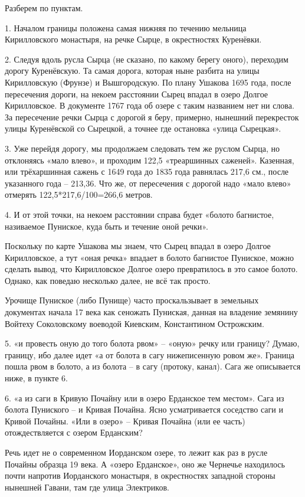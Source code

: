 Разберем по пунктам.

1. Началом границы положена самая нижняя по течению мельница Кирилловского монастыря, на речке Сырце, в окрестностях Куренёвки.

2. Следуя вдоль русла Сырца (не сказано, по какому берегу оного), переходим дорогу Куренёвскую. Та самая дорога, которая ныне разбита на улицы Кирилловскую (Фрунзе) и Вышгородскую. По плану Ушакова 1695 года, после пересечения дороги, на некоем расстоянии Сырец впадал в озеро Долгое Кирилловское. В документе 1767 года об озере с таким названием нет ни слова. За пересечение речки Сырца с дорогой я беру, примерно, нынешний перекресток улицы Куренёвской со Сырецкой, а точнее где остановка «улица Сырецкая».

3. Уже перейдя дорогу, мы продолжаем следовать тем же руслом Сырца, но отклоняясь «мало влево», и проходим 122,5 «треаршинных саженей». Казенная, или трёхаршинная сажень с 1649 года до 1835 года равнялась 217,6 см., после указанного года – 213,36. Что же, от пересечения с дорогой надо «мало влево» отмерять 122,5*217,6/100=266,6 метров.

4. И от этой точки, на некоем расстоянии справа будет «болото багнистое, називаемое Пуниское, куда быть и течение оной речки».

Поскольку по карте Ушакова мы знаем, что Сырец впадал в озеро Долгое Кирилловское, а тут «оная речка» впадает в болото багнистое Пуниское, можно сделать вывод, что Кирилловское Долгое озеро превратилось в это самое болото. Однако, как поведаю несколько далее, не всё так просто.

Урочище Пуниское (либо Пунище) часто проскальзывает в земельных документах начала 17 века как сеножать Пуниская, данная на владение земянину Войтеху Соколовскому воеводой Киевским, Константином Острожским.

5. «и провесть оную до того болота рвом» – «оную» речку или границу? Думаю, границу, ибо далее идет «а от болота в сагу нижеписенную ровом же». Граница пошла рвом в болото, а из болота – в сагу (протоку, канал). Сага же описывается ниже, в пункте 6.

6. «а из саги в Кривую Почайну или в озеро Ерданское тем местом». Сага из болота Пуниского – и Кривая Почайна. Ясно усматривается соседство саги и Кривой Почайны. «Или в озеро» – Кривая Почайна (или ее часть) отождествляется с озером Ерданским?

Речь идет не о современном Иорданском озере, то лежит как раз в русле Почайны образца 19 века. А «озеро Ерданское», оно же Чернечье находилось почти напротив Иорданского монастыря, в окрестностях западной стороны нынешней Гавани, там где улица Электриков.

